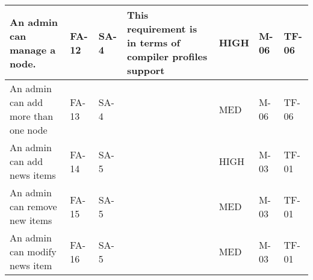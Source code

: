 \begin{supertabular}{|p{2cm}|l|m{0.33795986in}|m{1.2684599in}|m{0.5254598in}|m{1.0983598in}|m{1.0566599in}|}
An admin can manage a node. & FA-12 & SA-4 & This requirement is in terms of
compiler profiles support & HIGH & M-06 & TF-06\\ 
\hline 

An admin can add more than one node & FA-13 & SA-4 & & MED & M-06 & TF-06\\ 
\hline 

An admin can add news items & FA-14 & SA-5 & & HIGH & M-03 & TF-01\\ 
\hline

An admin can remove new items & FA-15 & SA-5 & & MED & M-03 & TF-01\\ 
\hline 

An admin can modify news item & FA-16 & SA-5 & & MED & M-03 & TF-01\\ 
\hline 
\end{supertabular}


